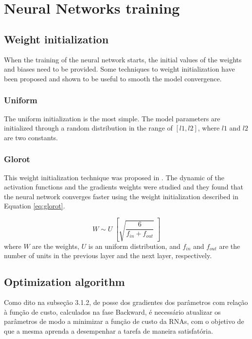 \section{Neural Networks training}

\subsection{Weight initialization}
When the training of the neural network starts, the initial values of the weights and biases need to be provided. Some techniques to weight initialization have been proposed and shown to be useful to smooth the model convergence.

\subsubsection{Uniform}
The uniform initialization is the most simple. The model parameters are initialized through a random distribution in the range of $[l1, l2]$, where $l1$ and $l2$ are two constants.

\subsubsection{Glorot}
This weight initialization technique was proposed in \cite{glorot2010understanding}. The dynamic of the activation functions and the gradients weights were studied and they found that the neural network converges faster using the weight initialization described in Equation \ref{eq:glorot}.

\begin{equation}
W \sim U \; \left[\sqrt{\frac{6}{f_{in}+f_{out}}}\; \right] 
\label{eq:glorot}
\end{equation}
where $W$ are the weights, $U$ is an uniform distribution, and $f_{in}$ and $f_{out}$ are the number of units in the previous layer and the next layer, respectively.

\subsection{Optimization algorithm}
Como dito na subseção 3.1.2, de posse dos gradientes dos parâmetros com
relação à função de custo, calculados na fase Backward, é necessário atualizar os
parâmetros de modo a minimizar a função de custo da RNAs, com o objetivo de
que a mesma aprenda a desempenhar a tarefa de maneira satisfatória.

